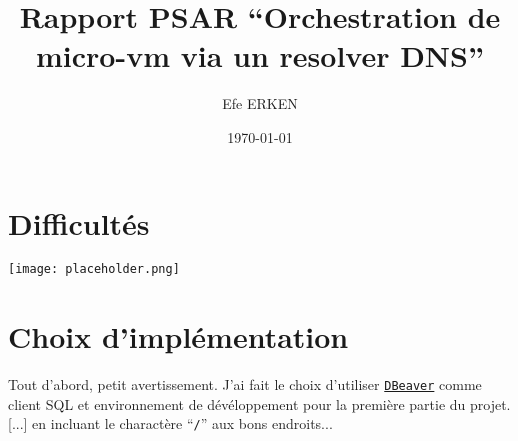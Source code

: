 \documentclass[12pt]{article}
\author{Efe ERKEN}
\date{\today}
\title{Rapport PSAR ``Orchestration de micro-vm via un resolver DNS''}
\begin{document}
\maketitle

\section{Difficultés}
\begin{center}
	\texttt{[image: placeholder.png]}
\end{center}

\section{Choix d'implémentation}
Tout d'abord, petit avertissement. J'ai fait le choix d'utiliser
\href{https://dbeaver.io/}{\texttt{DBeaver}} comme client SQL et environnement
de dévéloppement pour la première partie du projet. [...] en incluant le charactère
``\texttt{/}'' aux bons endroits... \\
\end{document}

